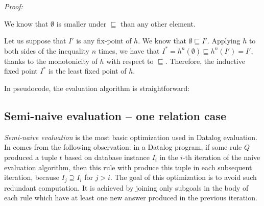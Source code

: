\emph{Proof:} 

We know that $\emptyset$ is smaller under $\sqsubseteq$ than any other element.

Let us suppose that $I'$ is any fix-point of $h$.  We know that $\emptyset \sqsubseteq I'$. Applying $h$ to both sides of the inequality $n$ times, we have that $I^* = h^n(\emptyset) \sqsubseteq h^n(I') = I'$, thanks to the monotonicity of $h$ with respect to $\sqsubseteq$. Therefore, the inductive fixed point $I^*$ is the least fixed point of $h$.

In pseudocode, the evaluation algorithm is straightforward:

\begin{figure}[h!]
\end{figure}




\subsection{Semi-naive evaluation -- one relation case}
\emph{Semi-naive evaluation} is the most basic optimization used in Datalog evaluation. In comes from the following observation: in a Datalog program, if some rule $Q$ produced a tuple $t$ based on database instance $I_i$ in the $i$-th iteration of the naive evaluation algorithm, then this rule with produce this tuple in each subsequent iteration, because $I_j \supseteq I_i$ for $j > i$. The goal of this optimization is to avoid such redundant computation. It is achieved by joining only subgoals in the body of each rule which have at least one new answer produced in the previous iteration.

